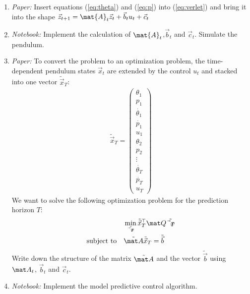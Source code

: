 \begin{exercise}[subtitle={Paper + Notebook}]
\begin{enumerate}[label=\emph{\alph*)}]
\item \textit{Paper:} Insert equations (\ref{eq:theta}) and (\ref{eq:p}) into (\ref{eq:verlet}) and bring it into the shape $\vec z_{t+1} = \mat{A}_t \vec z_t + \vec b_t u_t + \vec c_t$
\item \textit{Notebook:} Implement the calculation of $\mat{A}_t$,$\vec b_t$ and $\vec c_t$. Simulate the pendulum.
\item \textit{Paper:} To convert the problem to an optimization problem, the time-dependent pendulum states $\vec{x}_t$ are extended by the control $u_t$ and stacked into one vector $\tilde{\vec x}_T$: 
\begin{align*}
\tilde{\vec x}_T = \begin{pmatrix}
\theta_1\\
p_1\\
\dot{\theta_1}\\
\dot{p_1}\\
u_1\\
\theta_2\\
p_2\\
\vdots\\
\dot{\theta_T}\\
\dot{p_T}\\
u_T
\end{pmatrix}
\end{align*}
We want to solve the following optimization problem for the prediction horizon $T$:
\begin{align*}
&\min_{\tilde{\vec{x}_T}} \tilde{\vec x}_T^\top \mat Q \tilde{\vec{x}_T}\\
\text{subject to} \quad & \tilde{\mat A}\tilde{\vec x}_T = \tilde{\vec b}
\end{align*}
Write down the structure of the matrix $\tilde{\mat A}$ and the vector $\tilde{\vec b}$ using $\mat A_t$, $\vec b_t$ and $\vec c_t$.
\item \textit{Notebook:} Implement the model predictive control algorithm.
\end{enumerate}
\end{exercise}


